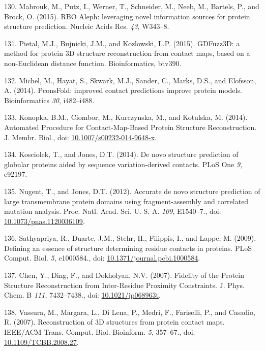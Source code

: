 \documentclass[11pt,a4paper,twoside]{book}
\theoremstyle{definition}
\theoremstyle{definition}
\theoremstyle{remark}
\begin{document}
\hypertarget{ref-Mabrouk2015a}{}
130. Mabrouk, M., Putz, I., Werner, T., Schneider, M., Neeb, M.,
Bartels, P., and Brock, O. (2015). RBO Aleph: leveraging novel
information sources for protein structure prediction. Nucleic Acids Res.
\emph{43}, W343--8.

\hypertarget{ref-Pietal2015a}{}
131. Pietal, M.J., Bujnicki, J.M., and Kozlowski, L.P. (2015). GDFuzz3D:
a method for protein 3D structure reconstruction from contact maps,
based on a non-Euclidean distance function. Bioinformatics, btv390.

\hypertarget{ref-Michel2014}{}
132. Michel, M., Hayat, S., Skwark, M.J., Sander, C., Marks, D.S., and
Elofsson, A. (2014). PconsFold: improved contact predictions improve
protein models. Bioinformatics \emph{30}, i482--i488.

\hypertarget{ref-Konopka2014}{}
133. Konopka, B.M., Ciombor, M., Kurczynska, M., and Kotulska, M.
(2014). Automated Procedure for Contact-Map-Based Protein Structure
Reconstruction. J. Membr. Biol., doi:
\href{https://doi.org/10.1007/s00232-014-9648-x}{10.1007/s00232-014-9648-x}.

\hypertarget{ref-Kosciolek2014}{}
134. Kosciolek, T., and Jones, D.T. (2014). De novo structure prediction
of globular proteins aided by sequence variation-derived contacts. PLoS
One \emph{9}, e92197.

\hypertarget{ref-Nugent2012}{}
135. Nugent, T., and Jones, D.T. (2012). Accurate de novo structure
prediction of large transmembrane protein domains using
fragment-assembly and correlated mutation analysis. Proc. Natl. Acad.
Sci. U. S. A. \emph{109}, E1540--7., doi:
\href{https://doi.org/10.1073/pnas.1120036109}{10.1073/pnas.1120036109}.

\hypertarget{ref-Sathyapriya2009}{}
136. Sathyapriya, R., Duarte, J.M., Stehr, H., Filippis, I., and Lappe,
M. (2009). Defining an essence of structure determining residue contacts
in proteins. PLoS Comput. Biol. \emph{5}, e1000584., doi:
\href{https://doi.org/10.1371/journal.pcbi.1000584}{10.1371/journal.pcbi.1000584}.

\hypertarget{ref-Chen2007}{}
137. Chen, Y., Ding, F., and Dokholyan, N.V. (2007). Fidelity of the
Protein Structure Reconstruction from Inter-Residue Proximity
Constraints. J. Phys. Chem. B \emph{111}, 7432--7438., doi:
\href{https://doi.org/10.1021/jp068963t}{10.1021/jp068963t}.

\hypertarget{ref-Vassura2007}{}
138. Vassura, M., Margara, L., Di Lena, P., Medri, F., Fariselli, P.,
and Casadio, R. (2007). Reconstruction of 3D structures from protein
contact maps. IEEE/ACM Trans. Comput. Biol. Bioinform. \emph{5},
357--67., doi:
\href{https://doi.org/10.1109/TCBB.2008.27}{10.1109/TCBB.2008.27}.
\end{document}
